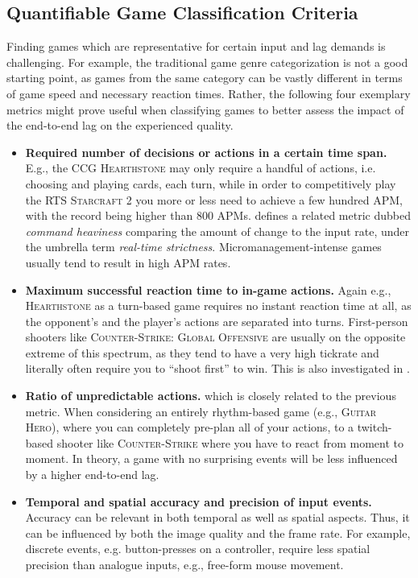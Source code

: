 \subsection{Quantifiable Game Classification Criteria}

Finding games which are representative for certain input and lag demands is challenging.
For example, the traditional game genre categorization is not a good starting point, as games from the same category can be vastly different in terms of game speed and necessary reaction times.
Rather, the following four exemplary metrics might prove useful when classifying games to better assess the impact of the end-to-end lag on the experienced quality.

 \begin{itemize}
    \item \textbf{Required number of decisions or actions in a certain time span.} E.g., the \gls{CCG} \textsc{Hearthstone} may only require a handful of actions, i.e. choosing and playing cards, each turn, while in order to competitively play the \gls{RTS} \textsc{Starcraft 2} you more or less need to achieve a few hundred \gls{APM}, with the record being higher than $800$ \glspl{APM}. \cite{6404025} defines a related metric dubbed \textit{command heaviness} comparing the amount of change to the input rate, under the umbrella term \textit{real-time strictness}. %
    Micromanagement-intense games usually tend to result in high APM rates.

    \item \textbf{Maximum successful reaction time to in-game actions.} Again e.g., \textsc{Hearthstone} as a turn-based game requires no instant reaction time at all, as the opponent's and the player's actions are separated into turns. First-person shooters like \textsc{Counter-Strike: Global Offensive} are usually on the opposite extreme of this spectrum, as they tend to have a very high tickrate and literally often require you to ``shoot first'' to win. This is also investigated in \cite{Claypool:2006:LPA:1167838.1167860}.

    \item \textbf{Ratio of unpredictable actions.} which is closely related to the previous metric. When considering an entirely rhythm-based game (e.g., \textsc{Guitar Hero}), where you can completely pre-plan all of your actions, to a twitch-based shooter like \textsc{Counter-Strike} where you have to react from moment to moment. In theory, a game with no surprising events will be less influenced by a higher end-to-end lag.

    \item \textbf{Temporal and spatial accuracy and precision of input events.} Accuracy can be relevant in both temporal as well as spatial aspects.
    Thus, it can be influenced by both the image quality and the frame rate.
    For example, discrete events, e.g. button-presses on a controller, require less spatial precision than analogue inputs, e.g., free-form mouse movement.
\end{itemize}


